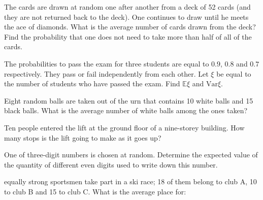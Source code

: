 \documentclass[14pt]{exam}
\newcommand{\EE}{{\ensuremath{\mathbb{E}}}}
\newcommand{\Var}{{\ensuremath{\textrm{Var}}}}
\begin{document}
\begin{questions}
		
		\question
		The cards are drawn at random one after another from a deck of 52 cards (and they are not returned back to the deck). One continues to draw until he meets the ace of diamonds. What is the average number of cards drawn from the deck? Find the probability that one does not need to take more than half of all of the cards.
		






		
		\question
		The probabilities to pass the exam for three students are equal to $0.9$, $0.8$ and $0.7$ respectively. They pass or fail independently from each other. Let $\xi$ be equal to the number of students who have passed the exam. Find $\EE\xi$ and $\Var\xi$.
		





		
		\question
		Eight random balls are taken out of the urn that contains 10 white balls and 15 black balls. What is the average number of white balls among the ones taken?
		
		
		
		
		
		
		\question
		Ten people entered the lift at the ground floor of a nine-storey building. How many stops is the lift going to make as it goes up?
		




		
		\question
		One of three-digit numbers is chosen at random. Determine the expected value of the quantity of different even digits used to write down this number.
		




		
		 equally strong sportsmen take part in a ski race; 18 of them belong to club A, 10 to club B and 15 to club C. What is the average place for:
		
		





\end{questions}
\end{document}
